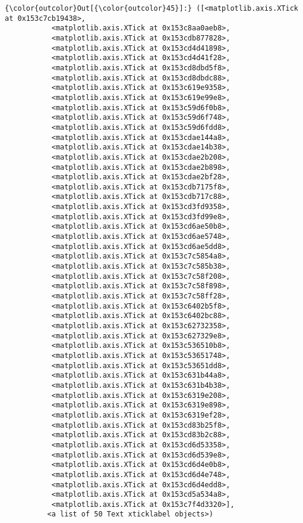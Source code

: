 \documentclass[11pt]{article}
\begin{document}
\begin{Verbatim}[commandchars=\\\{\}]
{\color{outcolor}Out[{\color{outcolor}45}]:} ([<matplotlib.axis.XTick at 0x153c7cb19438>,
           <matplotlib.axis.XTick at 0x153c8aa0aeb8>,
           <matplotlib.axis.XTick at 0x153cdb877828>,
           <matplotlib.axis.XTick at 0x153cd4d41898>,
           <matplotlib.axis.XTick at 0x153cd4d41f28>,
           <matplotlib.axis.XTick at 0x153cd8dbd5f8>,
           <matplotlib.axis.XTick at 0x153cd8dbdc88>,
           <matplotlib.axis.XTick at 0x153c619e9358>,
           <matplotlib.axis.XTick at 0x153c619e99e8>,
           <matplotlib.axis.XTick at 0x153c59d6f0b8>,
           <matplotlib.axis.XTick at 0x153c59d6f748>,
           <matplotlib.axis.XTick at 0x153c59d6fdd8>,
           <matplotlib.axis.XTick at 0x153cdae144a8>,
           <matplotlib.axis.XTick at 0x153cdae14b38>,
           <matplotlib.axis.XTick at 0x153cdae2b208>,
           <matplotlib.axis.XTick at 0x153cdae2b898>,
           <matplotlib.axis.XTick at 0x153cdae2bf28>,
           <matplotlib.axis.XTick at 0x153cdb7175f8>,
           <matplotlib.axis.XTick at 0x153cdb717c88>,
           <matplotlib.axis.XTick at 0x153cd3fd9358>,
           <matplotlib.axis.XTick at 0x153cd3fd99e8>,
           <matplotlib.axis.XTick at 0x153cd6ae50b8>,
           <matplotlib.axis.XTick at 0x153cd6ae5748>,
           <matplotlib.axis.XTick at 0x153cd6ae5dd8>,
           <matplotlib.axis.XTick at 0x153c7c5854a8>,
           <matplotlib.axis.XTick at 0x153c7c585b38>,
           <matplotlib.axis.XTick at 0x153c7c58f208>,
           <matplotlib.axis.XTick at 0x153c7c58f898>,
           <matplotlib.axis.XTick at 0x153c7c58ff28>,
           <matplotlib.axis.XTick at 0x153c6402b5f8>,
           <matplotlib.axis.XTick at 0x153c6402bc88>,
           <matplotlib.axis.XTick at 0x153c62732358>,
           <matplotlib.axis.XTick at 0x153c627329e8>,
           <matplotlib.axis.XTick at 0x153c536510b8>,
           <matplotlib.axis.XTick at 0x153c53651748>,
           <matplotlib.axis.XTick at 0x153c53651dd8>,
           <matplotlib.axis.XTick at 0x153c631b44a8>,
           <matplotlib.axis.XTick at 0x153c631b4b38>,
           <matplotlib.axis.XTick at 0x153c6319e208>,
           <matplotlib.axis.XTick at 0x153c6319e898>,
           <matplotlib.axis.XTick at 0x153c6319ef28>,
           <matplotlib.axis.XTick at 0x153cd83b25f8>,
           <matplotlib.axis.XTick at 0x153cd83b2c88>,
           <matplotlib.axis.XTick at 0x153cd6d53358>,
           <matplotlib.axis.XTick at 0x153cd6d539e8>,
           <matplotlib.axis.XTick at 0x153cd6d4e0b8>,
           <matplotlib.axis.XTick at 0x153cd6d4e748>,
           <matplotlib.axis.XTick at 0x153cd6d4edd8>,
           <matplotlib.axis.XTick at 0x153cd5a534a8>,
           <matplotlib.axis.XTick at 0x153c7f4d3320>],
          <a list of 50 Text xticklabel objects>)
\end{Verbatim}
            
\end{document}
